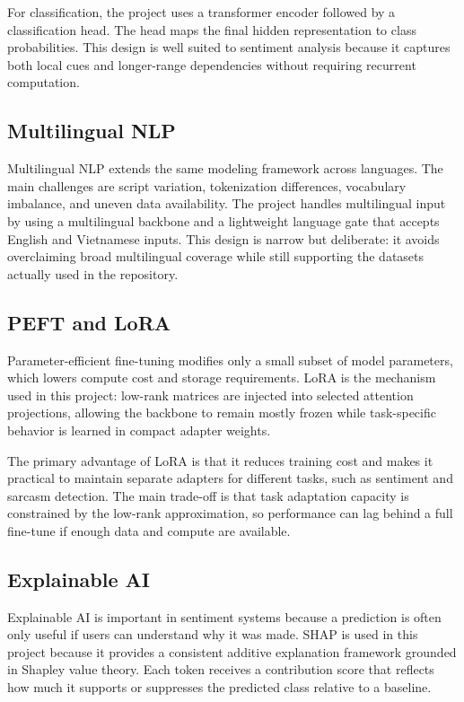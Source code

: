 \documentclass[12pt, a4paper]{article}
\begin{document}
For classification, the project uses a transformer encoder followed by a classification head. The head maps the final hidden representation to class probabilities. This design is well suited to sentiment analysis because it captures both local cues and longer-range dependencies without requiring recurrent computation.

\subsection{Multilingual NLP}
Multilingual NLP extends the same modeling framework across languages. The main challenges are script variation, tokenization differences, vocabulary imbalance, and uneven data availability. The project handles multilingual input by using a multilingual backbone and a lightweight language gate that accepts English and Vietnamese inputs. This design is narrow but deliberate: it avoids overclaiming broad multilingual coverage while still supporting the datasets actually used in the repository.

\subsection{PEFT and LoRA}
Parameter-efficient fine-tuning modifies only a small subset of model parameters, which lowers compute cost and storage requirements. LoRA is the mechanism used in this project: low-rank matrices are injected into selected attention projections, allowing the backbone to remain mostly frozen while task-specific behavior is learned in compact adapter weights.

The primary advantage of LoRA is that it reduces training cost and makes it practical to maintain separate adapters for different tasks, such as sentiment and sarcasm detection. The main trade-off is that task adaptation capacity is constrained by the low-rank approximation, so performance can lag behind a full fine-tune if enough data and compute are available.

\subsection{Explainable AI}
Explainable AI is important in sentiment systems because a prediction is often only useful if users can understand why it was made. SHAP is used in this project because it provides a consistent additive explanation framework grounded in Shapley value theory. Each token receives a contribution score that reflects how much it supports or suppresses the predicted class relative to a baseline.
\end{document}
